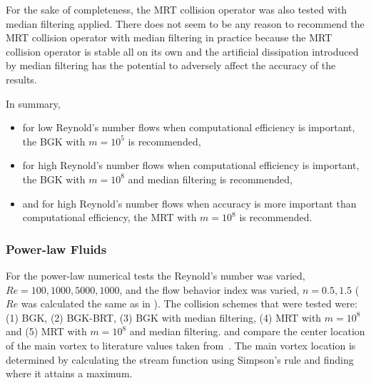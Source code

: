 \documentclass[pdftex,ms]{pittetd}
\begin{document}
For the sake of completeness, the MRT collision operator was also tested with median filtering applied.
There does not seem to be any reason to recommend the MRT collision operator with median filtering in practice because the MRT collision operator is stable all on its own and the artificial dissipation introduced by median filtering has the potential to adversely affect the accuracy of the results.

In summary, 
\begin{itemize}
    \item for low Reynold's number flows when computational efficiency is important, the BGK with $m = 10^5$ is recommended,
    \item for high Reynold's number flows when computational efficiency is important, the BGK with $m = 10^8$ and median filtering is recommended,
    \item and for high Reynold's number flows when accuracy is more important than computational efficiency, the MRT with $m = 10^8$ is recommended.
\end{itemize} 

\subsubsection{Power-law Fluids}

For the power-law numerical tests the Reynold's number was varied, $Re = 100, 1000, 5000, 1000$, and the flow behavior index was varied, $n = 0.5, 1.5$ ($Re$ was calculated the same as in ).
The collision schemes that were tested were: (1) BGK, (2) BGK-BRT, (3) BGK with median filtering, (4) MRT with $m = 10^8$ and (5) MRT with $m = 10^8$ and median filtering.
 and  compare the center location of the main vortex to literature values taken from~\citet{li2014simulation}.
The main vortex location is determined by calculating the stream function using Simpson's rule and finding where it attains a maximum.
\end{document}
